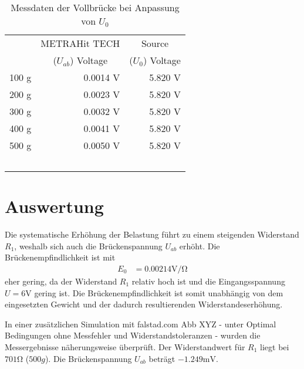 \begin{table}[!h]
    \centering
    \begin{tabular}{rrr}
        \toprule
            ~ & \multicolumn{1}{c}{METRAHit TECH} & \multicolumn{1}{c}{Source} \\
            ~ & \multicolumn{1}{c}{($U_{ab}$) Voltage} & \multicolumn{1}{c}{($U_{0}$) Voltage} \\
        \midrule
            100 \si{\gram} & 0.0014 \si{\volt} & 5.820 \si{\volt} \\
            200 \si{\gram} & 0.0023 \si{\volt} & 5.820 \si{\volt} \\
            300 \si{\gram} & 0.0032 \si{\volt} & 5.820 \si{\volt} \\
            400 \si{\gram} & 0.0041 \si{\volt} & 5.820 \si{\volt} \\
            500 \si{\gram} & 0.0050 \si{\volt} & 5.820 \si{\volt} \\
            ~ & ~ \\
        \bottomrule
        \end{tabular}
    \caption{Messdaten der Vollbrücke bei Anpassung von \(U_0\)} \label{tab:full-bridge-voltage-adjustment}
\end{table}

\section[Auswertung]{Auswertung}

Die systematische Erhöhung der Belastung führt zu einem steigenden Widerstand \( R_1 \),
weshalb sich auch die Brückenspannung \( U_{ab} \) erhöht.
Die Brückenempfindlichkeit ist mit
\begin{align}
    E_0 &= 0.00214 \si{\volt\per\ohm}
\end{align}
eher gering, da der Widerstand \( R_1 \) relativ hoch ist
und die Eingangsspannung \( U = 6 \si{\volt} \) gering ist.
Die Brückenempfindlichkeit ist somit unabhängig von dem eingesetzten Gewicht
und der dadurch resultierenden Widerstandeserhöhung.

In einer zusätzlichen Simulation mit falstad.com Abb XYZ
- unter Optimal Bedingungen ohne Messfehler und Widerstandstoleranzen -
wurden die Messergebnisse näherungsweise überprüft.
Der Widerstandwert für \( R_1 \) liegt bei \( 701 \si{\ohm} \) (\( 500g \)).
Die Brückenspannung \( U_{ab} \) beträgt \( -1.249 \si{\milli\volt} \).
